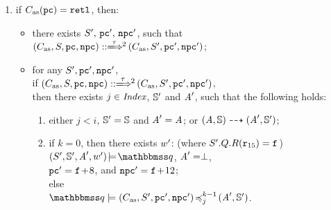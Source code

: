 \begin{definition}
\begin{enumerate}[1.]
        \item if $C_{\text{as}}(\texttt{pc}) = \texttt{retl}{}$, then: 
            \begin{itemize}
                \item there exists $S', \, \texttt{pc}', \, \texttt{npc}'$, 
                such that \\
                   $\LGlobMultiTrans{(\asmimp, \state, \pc, \npc)}
                       {\empmsg\,}{2}{(\asmimp, \state', \pc', \npc')}$;
                \item for any $S', \texttt{pc}', \texttt{npc}'$, \\
                    if $\LGlobMultiTrans{(\asmimp, \state, \pc, \npc)}
                            {\empmsg\,}{2}{(\asmimp, \state', \pc', \npc')}$, \\
                    then there exists $j \in \textit{Index}$, $\mathbb{S}'$ and 
                    $\textit{A}'$, such that the following holds: 
                    \begin{enumerate}
                        \item either $j < i$, $\mathbb{S}' = \mathbb{S}$
                            and $\textit{A}' = \textit{A}$; or
                            ${(\textit{A}, \mathbb{S})} \dashrightarrow {(\textit{A}', \mathbb{S}')}$;
                        \item if $k = 0$, then there exists 
                        	$w'$: 
                        	(where $S'.Q.R(\texttt{r}_{15})
                        	 = \texttt{f}_{}$) \\
                            \hspace*{2em} 
                            $\asrtmodel{(\state', \hpstate', \primcom', \word')}
                                {\relastQ}$, 
                            $\textit{A}' = \perp$, \\
                            \hspace*{2em}
                            $\texttt{pc}' = \texttt{f}_{}\!+\!8$, and 
                            $\texttt{npc}' = \texttt{f}_{}\!+\!12$; \\
                            else \\
                            \hspace*{2em}
                            $\simFunctionSt{\relastQ}{(\asmimp, \state', \pc', \npc')}
                                {j}{k-1}{(\primcom', \hpstate')}$.
                    \end{enumerate}
            \end{itemize}        
    \end{enumerate}
\end{definition}
 
